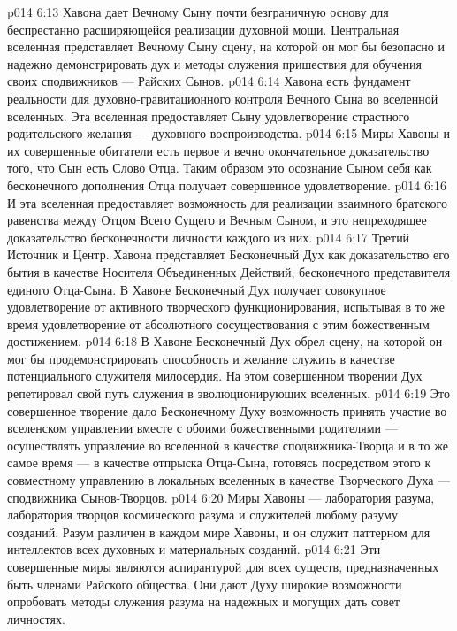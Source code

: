 \vs p014 6:13 Хавона дает Вечному Сыну почти безграничную основу для беспрестанно расширяющейся реализации духовной мощи. Центральная вселенная представляет Вечному Сыну сцену, на которой он мог бы безопасно и надежно демонстрировать дух и методы служения пришествия для обучения своих сподвижников --- Райских Сынов.
\vs p014 6:14 Хавона есть фундамент реальности для духовно\hyp{}гравитационного контроля Вечного Сына во вселенной вселенных. Эта вселенная предоставляет Сыну удовлетворение страстного родительского желания --- духовного воспроизводства.
\vs p014 6:15 Миры Хавоны и их совершенные обитатели есть первое и вечно окончательное доказательство того, что Сын есть Слово Отца. Таким образом это осознание Сыном себя как бесконечного дополнения Отца получает совершенное удовлетворение.
\vs p014 6:16 И эта вселенная предоставляет возможность для реализации взаимного братского равенства между Отцом Всего Сущего и Вечным Сыном, и это непреходящее доказательство бесконечности личности каждого из них.
\vs p014 6:17 \bibnobreakspace {} Третий Источник и Центр. Хавона представляет Бесконечный Дух как доказательство его бытия в качестве Носителя Объединенных Действий, бесконечного представителя единого Отца\hyp{}Сына. В Хавоне Бесконечный Дух получает совокупное удовлетворение от активного творческого функционирования, испытывая в то же время удовлетворение от абсолютного сосуществования с этим божественным достижением.
\vs p014 6:18 В Хавоне Бесконечный Дух обрел сцену, на которой он мог бы продемонстрировать способность и желание служить в качестве потенциального служителя милосердия. На этом совершенном творении Дух репетировал свой путь служения в эволюционирующих вселенных.
\vs p014 6:19 Это совершенное творение дало Бесконечному Духу возможность принять участие во вселенском управлении вместе с обоими божественными родителями --- осуществлять управление во вселенной в качестве сподвижника\hyp{}Творца и в то же самое время --- в качестве отпрыска Отца\hyp{}Сына, готовясь посредством этого к совместному управлению в локальных вселенных в качестве Творческого Духа --- сподвижника Сынов\hyp{}Творцов.
\vs p014 6:20 Миры Хавоны --- лаборатория разума, лаборатория творцов космического разума и служителей любому разуму созданий. Разум различен в каждом мире Хавоны, и он служит паттерном для интеллектов всех духовных и материальных созданий.
\vs p014 6:21 Эти совершенные миры являются аспирантурой для всех существ, предназначенных быть членами Райского общества. Они дают Духу широкие возможности опробовать методы служения разума на надежных и могущих дать совет личностях.
